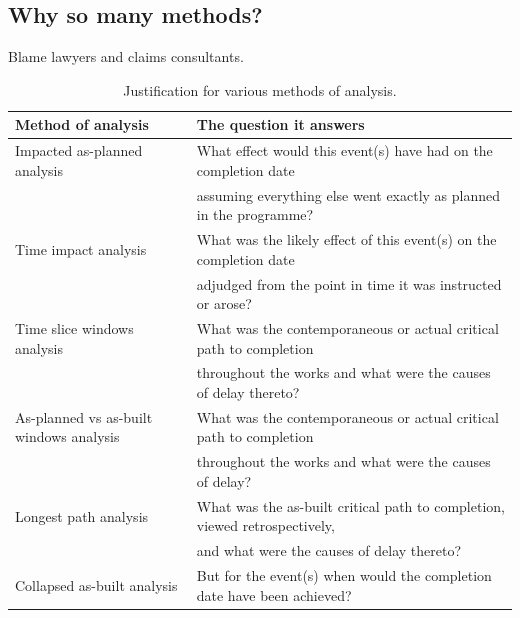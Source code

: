 \subsection{Why so many methods?}
Blame lawyers and claims consultants.
\begin{table}[H]
    \centering
    \begin{tabular}{@{}ll@{}}
        \toprule
        \textbf{Method of analysis}             & \textbf{The question it answers}                                           \\
        \midrule
        Impacted as-planned analysis            & What effect would this event(s) have had on the completion date            \\
                                                & assuming everything else went exactly as planned in the programme?         \\
        Time impact analysis                    & What was the likely effect of this event(s) on the completion date         \\
                                                & adjudged from the point in time it was instructed or arose?                \\
        Time slice windows analysis             & What was the contemporaneous or actual critical path to completion         \\
                                                & throughout the works and what were the causes of delay thereto?            \\
        As-planned vs as-built windows analysis & What was the contemporaneous or actual critical path to completion         \\
                                                & throughout the works and what were the causes of delay?                    \\
        Longest path analysis                   & What was the as-built critical path to completion, viewed retrospectively, \\
                                                & and what were the causes of delay thereto?                                 \\
        Collapsed as-built analysis             & But for the event(s) when would the completion date have been achieved?    \\
        \bottomrule
    \end{tabular}
    \caption{Justification for various methods of analysis.}
\end{table}
